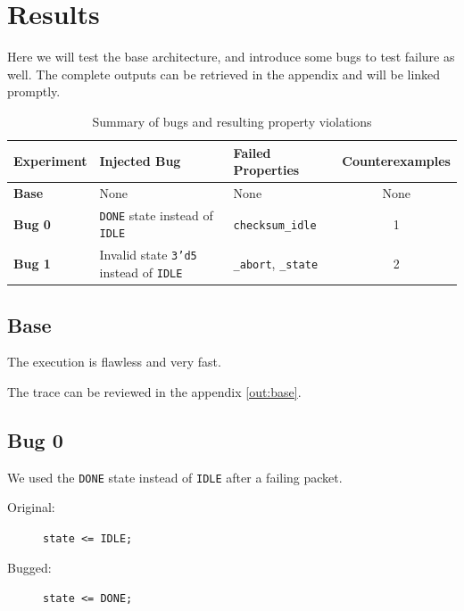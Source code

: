 \chapter{Results} 
\label{cha:results}

Here we will test the base architecture, and introduce some bugs to test failure as well.
The complete outputs can be retrieved in the appendix and will be linked promptly.

\begin{table}[h]
    \centering
    \begin{tabular}{@{}lllc@{}}
        \toprule
        \textbf{Experiment} & \textbf{Injected Bug}                                 & \textbf{Failed Properties}            & \textbf{Counterexamples}  \\ \midrule
        \textbf{Base}       & None                                                  & None                                  & None                      \\
        \textbf{Bug 0}      & \texttt{DONE} state instead of \texttt{IDLE}          & \texttt{checksum\_idle}               & 1                         \\
        \textbf{Bug 1}      & Invalid state \texttt{3'd5} instead of \texttt{IDLE}  & \texttt{\_abort}, \texttt{\_state}    & 2                         \\ \bottomrule
    \end{tabular}
    \caption{Summary of bugs and resulting property violations}
    \label{tab:bug_summary}
\end{table}

\section{Base}
The execution is flawless and very fast.

The trace can be reviewed in the appendix \ref{out:base}.

\section{Bug 0}
We used the \texttt{DONE} state instead of \texttt{IDLE} after a failing packet.

\begin{description}
    \item[Original:] \lstinline[style=svlog]|state <= IDLE;|
    \item[Bugged:]   \lstinline[style=svlog]|state <= DONE;|
\end{description}

